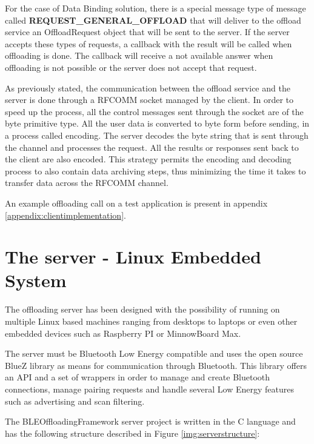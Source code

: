 For the case of Data Binding solution, there is a special message type of message called \textbf{REQUEST_GENERAL_OFFLOAD} that will deliver to the offload service an OffloadRequest object that will be sent to the server. If the server accepts these types of requests, a callback with the result will be called when offloading is done. The callback will receive a not available answer when offloading is not possible or the server does not accept that request.

As previously stated, the communication between the offload service and the server is done through a RFCOMM socket managed by the client. In order to speed up the process, all the control messages sent through the socket are of the byte primitive type. All the user data is converted to byte form before sending, in a process called encoding. The server decodes the byte string that is sent through the channel and processes the request. All the results or responses sent back to the client are also encoded. This strategy permits the encoding and decoding process to also contain data archiving steps, thus minimizing the time it takes to transfer data across the RFCOMM channel.

An example offloading call on a test application is present in appendix \ref{appendix:clientimplementation}.

\pagebreak

\section{The server - Linux Embedded System}

The offloading server has been designed with the possibility of running on multiple Linux based machines ranging from desktops to laptops or even other embedded devices such as Raspberry PI or MinnowBoard Max.

The server must be Bluetooth Low Energy compatible and uses the open source BlueZ\cite{holtmann2007bluez} library as means for communication through Bluetooth. This library offers an API and a set of wrappers in order to manage and create Bluetooth connections, manage pairing requests and handle several Low Energy features such as advertising and scan filtering.

The BLEOffloadingFramework server project is written in the C language and has the following structure described in Figure \ref{img:serverstructure}:


